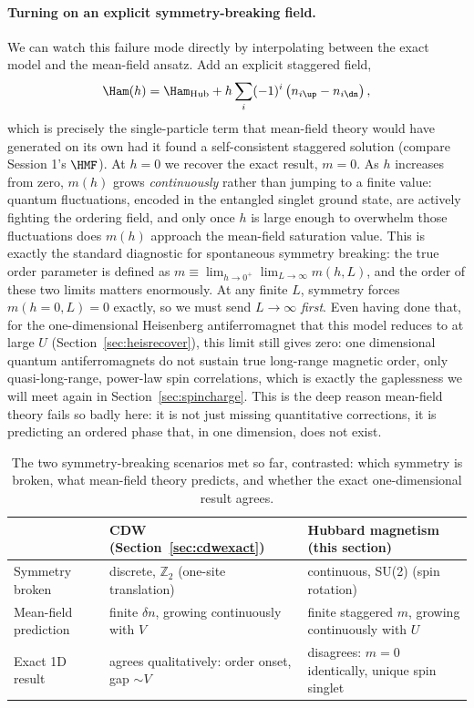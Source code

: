 \documentclass[all_sessions.tex]{subfiles}
\begin{document}
\paragraph{Turning on an explicit symmetry-breaking field.} We can watch this failure mode directly
by interpolating between the exact model and the mean-field ansatz. Add an explicit staggered
field,
\begin{equation}
  \Ham(h) = \Ham_{\mathrm{Hub}} + h\sum_i (-1)^i \left(n_{i\up} - n_{i\dn}\right),
  \label{eq:stagger}
\end{equation}
which is precisely the single-particle term that mean-field theory would have generated on its own
had it found a self-consistent staggered solution (compare Session 1's $\HMF$). At $h=0$ we recover
the exact result, $m=0$. As $h$ increases from zero, $m(h)$ grows \emph{continuously} rather than
jumping to a finite value: quantum fluctuations, encoded in the entangled singlet ground state, are
actively fighting the ordering field, and only once $h$ is large enough to overwhelm those
fluctuations does $m(h)$ approach the mean-field saturation value. This is exactly the standard
diagnostic for spontaneous symmetry breaking: the true order parameter is defined as $m \equiv
\lim_{h\to0^+}\lim_{L\to\infty} m(h,L)$, and the order of these two limits matters enormously. At
any finite $L$, symmetry forces $m(h{=}0,L)=0$ exactly, so we must send $L\to\infty$ \emph{first}.
Even having done that, for the one-dimensional Heisenberg antiferromagnet that this model reduces
to at large $U$ (Section~\ref{sec:heisrecover}), this limit still gives zero: one dimensional
quantum antiferromagnets do not sustain true long-range magnetic order, only quasi-long-range,
power-law spin correlations, which is exactly the gaplessness we will meet again in
Section~\ref{sec:spincharge}. This is the deep reason mean-field theory fails so badly here: it is
not just missing quantitative corrections, it is predicting an ordered phase that, in one
dimension, does not exist.

\begin{table}[H]
\centering
\small
\begin{tabular}{@{}P{3.3cm}P{4.3cm}P{4.3cm}@{}}
\toprule
 & \textbf{CDW (Section~\ref{sec:cdwexact})} & \textbf{Hubbard magnetism (this section)} \\
\midrule
Symmetry broken & discrete, $\mathbb Z_2$ (one-site translation) & continuous, SU(2) (spin
rotation) \\
Mean-field prediction & finite $\delta n$, growing continuously with $V$ & finite staggered $m$,
growing continuously with $U$ \\
Exact 1D result & agrees qualitatively: order onset, gap $\sim V$ & disagrees: $m=0$ identically,
unique spin singlet \\
\bottomrule
\end{tabular}
\caption{The two symmetry-breaking scenarios met so far, contrasted: which symmetry is broken,
what mean-field theory predicts, and whether the exact one-dimensional result agrees.}
\label{tab:cdwvshubbard}
\end{table}
\end{document}
